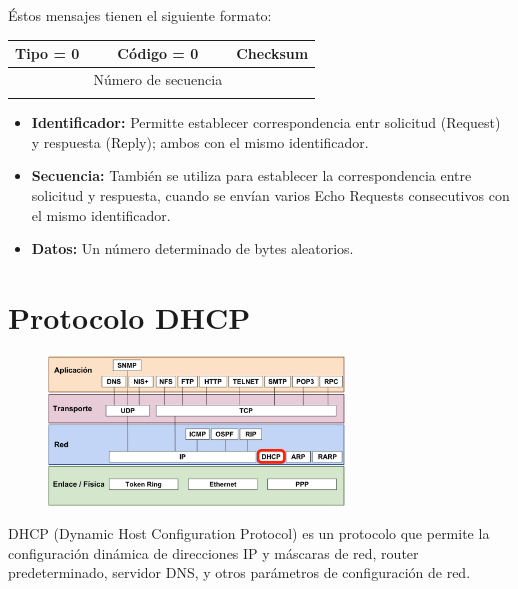 Éstos mensajes tienen el siguiente formato:

\begin{table}[H]
\centering
\begin{tabular}{|c|c|c|}
\hline
\rowcolor[HTML]{9AFF99} 
Tipo = 0 & Código = 0  & Checksum \\ \hline
\rowcolor[HTML]{FDAAAA} 
\multicolumn{2}{|c|}{\cellcolor[HTML]{FDAAAA}{\color[HTML]{000000} Identificador}} & {\color[HTML]{000000} Número de secuencia} \\ \hline
\rowcolor[HTML]{FDAAAA} 
\multicolumn{3}{|c|}{\cellcolor[HTML]{FDAAAA}Datos :::}  \\ \hline
\end{tabular}
\end{table}
\begin{itemize}
    \item \textbf{Identificador:} Permitte establecer correspondencia entr solicitud (Request) y respuesta (Reply); ambos con el mismo identificador.
    \item \textbf{Secuencia:} También se utiliza para establecer la correspondencia entre solicitud y respuesta, cuando se envían varios Echo Requests consecutivos con el mismo identificador.
    \item \textbf{Datos:} Un número determinado de bytes aleatorios.
\end{itemize}

\newpage
\section{Protocolo DHCP}
\begin{figure}[H]
    \centering
    \includegraphics[width=0.7\textwidth]{img/DHCP.png}
\end{figure}

DHCP (Dynamic Host Configuration Protocol) es un protocolo que permite la configuración dinámica de direcciones IP y máscaras de red, router predeterminado, servidor DNS, y otros parámetros de configuración de red.\\

